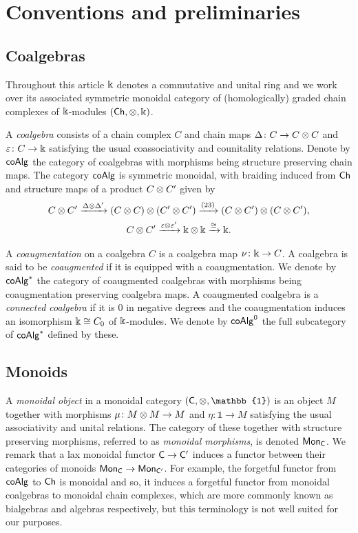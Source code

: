 
\section{Conventions and preliminaries}\label{s:preliminaries}

\subsection{Coalgebras}\label{ss:coalgebras}

Throughout this article $\Bbbk$ denotes a commutative and unital ring and we work over its associated symmetric monoidal category of (homologically) graded chain complexes of $\Bbbk$-modules $(\mathsf{Ch}, \otimes, \Bbbk)$.

A \textit{coalgebra} consists of a chain complex $C$ and chain maps $\Delta \colon C \to C \otimes C$ and $\varepsilon \colon C \to \Bbbk$ satisfying the usual coassociativity and counitality relations.
Denote by $\mathsf{coAlg}$ the category of coalgebras with morphisms being structure preserving chain maps.
The category $\mathsf{coAlg}$ is symmetric monoidal, with braiding induced from $\mathsf{Ch}$ and structure maps of a product $C \otimes C^\prime$ given by
\begin{gather*}
	C \otimes C^\prime \xrightarrow{\Delta \otimes \Delta^\prime}
	(C \otimes C) \otimes (C^\prime \otimes C^\prime) \xrightarrow{(23)}
	(C \otimes C^\prime) \otimes (C \otimes C^\prime), \\
	C \otimes C^\prime \xrightarrow{\varepsilon \otimes \varepsilon^\prime}
	\Bbbk \otimes \Bbbk \xrightarrow{\cong} \Bbbk.
\end{gather*}

A \textit{coaugmentation} on a coalgebra $C$ is a coalgebra map $\nu \colon \Bbbk \to C$.
A coalgebra is said to be \textit{coaugmented} if it is equipped with a coaugmentation.
We denote by $\mathsf{coAlg}^\ast$ the category of coaugmented coalgebras with morphisms being coaugmentation preserving coalgebra maps.
A coaugmented coalgebra is a \textit{connected coalgebra} if it is $0$ in negative degrees and the coaugmentation induces an isomorphism $\Bbbk \cong C_0$ of $\Bbbk$-modules.
We denote by $\mathsf{coAlg}^0$ the full subcategory of $\mathsf{coAlg}^\ast$ defined by these.

\subsection{Monoids}

A \textit{monoidal object} in a monoidal category $(\sC, \ot, \mathbb{1})$ is an object $M$ together with morphisms $\mu \colon M \otimes M \to M$ and $\eta \colon \mathbb{1} \to M$ satisfying the usual associativity and unital relations.
The category of these together with structure preserving morphisms, referred to as \textit{monoidal morphisms}, is denoted $\mathsf{Mon}_{\mathsf{C}}$.
We remark that a lax monoidal functor $\mathsf{C} \to \mathsf{C}^\prime$ induces a functor between their categories of monoids $\mathsf{Mon}_{\mathsf{C}} \to \mathsf{Mon}_{\mathsf{C}^\prime}$.
For example, the forgetful functor from $\mathsf{coAlg}$ to $\mathsf{Ch}$ is monoidal and so, it induces a forgetful functor from monoidal coalgebras to monoidal chain complexes, which are more commonly known as bialgebras and algebras respectively, but this terminology is not well suited for our purposes.

